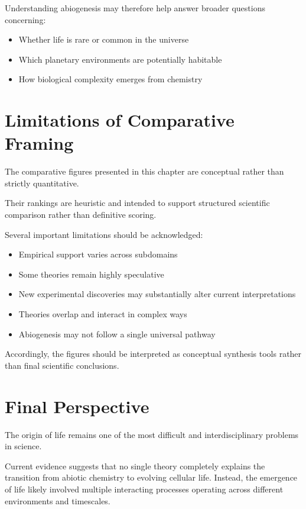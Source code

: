 \documentclass[
  oneside]{book}
\providecommand{\tightlist}{%
  \setlength{\itemsep}{0pt}\setlength{\parskip}{0pt}}
\begin{document}
Understanding abiogenesis may therefore help answer broader questions concerning:

\begin{itemize}
\tightlist
\item
  Whether life is rare or common in the universe
\item
  Which planetary environments are potentially habitable
\item
  How biological complexity emerges from chemistry
\end{itemize}

\section{Limitations of Comparative Framing}\label{limitations-of-comparative-framing}

The comparative figures presented in this chapter are conceptual rather than strictly quantitative.

Their rankings are heuristic and intended to support structured scientific comparison rather than definitive scoring.

Several important limitations should be acknowledged:

\begin{itemize}
\tightlist
\item
  Empirical support varies across subdomains
\item
  Some theories remain highly speculative
\item
  New experimental discoveries may substantially alter current interpretations
\item
  Theories overlap and interact in complex ways
\item
  Abiogenesis may not follow a single universal pathway
\end{itemize}

Accordingly, the figures should be interpreted as conceptual synthesis tools rather than final scientific conclusions.

\section{Final Perspective}\label{final-perspective}

The origin of life remains one of the most difficult and interdisciplinary problems in science.

Current evidence suggests that no single theory completely explains the transition from abiotic chemistry to evolving cellular life. Instead, the emergence of life likely involved multiple interacting processes operating across different environments and timescales.
\end{document}
